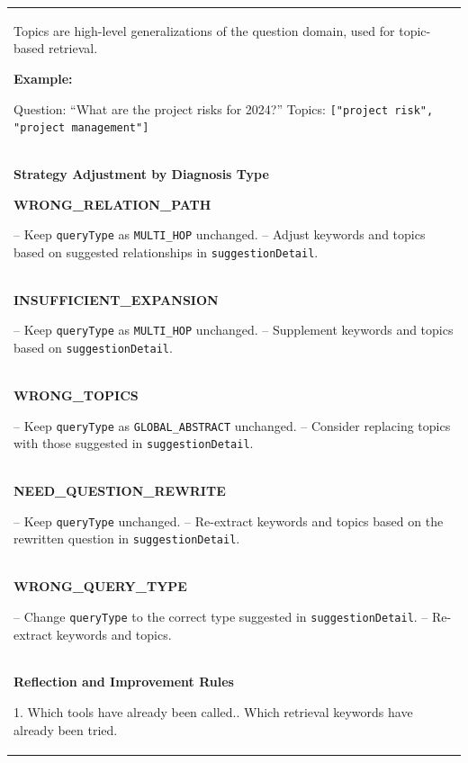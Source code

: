 {\begin{longtable}{@{}p{}@{}}
Topics are high-level generalizations of the question domain, used for topic-based retrieval.\par

\textbf{Example:}\par
Question: ``What are the project risks for 2024?''\newline
Topics: \texttt{["project risk", "project management"]}
\\


\textbf{Strategy Adjustment by Diagnosis Type}\par
\smallskip

\textbf{WRONG\_RELATION\_PATH}\par
-- Keep \texttt{queryType} as \texttt{MULTI\_HOP} unchanged.\newline
-- Adjust keywords and topics based on suggested relationships in
\texttt{suggestionDetail}.
\\

\textbf{INSUFFICIENT\_EXPANSION}\par
-- Keep \texttt{queryType} as \texttt{MULTI\_HOP} unchanged.\newline
-- Supplement keywords and topics based on \texttt{suggestionDetail}.
\\

\textbf{WRONG\_TOPICS}\par
-- Keep \texttt{queryType} as \texttt{GLOBAL\_ABSTRACT} unchanged.\newline
-- Consider replacing topics with those suggested in
\texttt{suggestionDetail}.
\\

\textbf{NEED\_QUESTION\_REWRITE}\par
-- Keep \texttt{queryType} unchanged.\newline
-- Re-extract keywords and topics based on the rewritten question in
\texttt{suggestionDetail}.
\\

\textbf{WRONG\_QUERY\_TYPE}\par
-- Change \texttt{queryType} to the correct type suggested in
\texttt{suggestionDetail}.\newline
-- Re-extract keywords and topics.
\\

\textbf{Reflection and Improvement Rules}\par
1. Which tools have already been called.\newline
2. Which retrieval keywords have already been tried.
\\


\end{longtable}}
